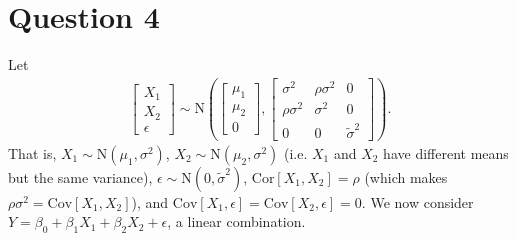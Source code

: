 \documentclass[10pt]{article}
\begin{document}
\section{Question 4} \noindent
Let 
\begin{align*}
    \begin{bmatrix}
        X_1 \\ X_2 \\ \epsilon
    \end{bmatrix} \sim \mathrm{N} \left( 
        \begin{bmatrix}
            \mu_1 \\ \mu_2 \\ 0
        \end{bmatrix},
        \begin{bmatrix}
            \sigma^2 & \rho \sigma^2 & 0 \\
            \rho \sigma^2 & \sigma^2 & 0 \\
            0 & 0 & \tilde{\sigma}^2
        \end{bmatrix}
     \right).
\end{align*}
That is, \(X_1 \sim \mathrm{N}(\mu_1, \sigma^2)\), \(X_2 \sim \mathrm{N}(\mu_2, \sigma^2)\) (i.e. \(X_1\) and \(X_2\) have different means but the same 
variance), \(\epsilon \sim \mathrm{N}(0, \tilde{\sigma}^2)\), \(\mathrm{Cor}[X_1, X_2] = \rho\) (which makes \(\rho \sigma^2 = \mathrm{Cov}[X_1, X_2]\)), and 
\(\mathrm{Cov}[X_1, \epsilon] = \mathrm{Cov}[X_2, \epsilon] = 0\). We now consider \(Y = \beta_0 + \beta_1 X_1 + \beta_2 X_2 + \epsilon\), a linear combination. 
\end{document}
